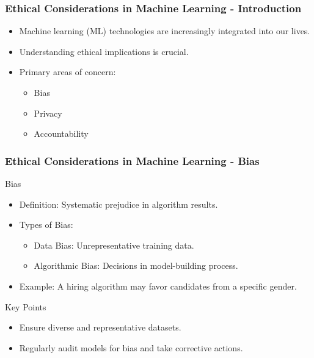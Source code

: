 \documentclass{beamer}
\begin{document}
\begin{frame}[fragile]
    \frametitle{Ethical Considerations in Machine Learning - Introduction}
    \begin{itemize}
        \item Machine learning (ML) technologies are increasingly integrated into our lives.
        \item Understanding ethical implications is crucial.
        \item Primary areas of concern:
        \begin{itemize}
            \item Bias
            \item Privacy
            \item Accountability
        \end{itemize}
    \end{itemize}
\end{frame}

\begin{frame}[fragile]
    \frametitle{Ethical Considerations in Machine Learning - Bias}
    \begin{block}{Bias}
        \begin{itemize}
            \item Definition: Systematic prejudice in algorithm results.
            \item Types of Bias:
            \begin{itemize}
                \item Data Bias: Unrepresentative training data.
                \item Algorithmic Bias: Decisions in model-building process.
            \end{itemize}
            \item Example: A hiring algorithm may favor candidates from a specific gender.
        \end{itemize}
    \end{block}
    \begin{block}{Key Points}
        \begin{itemize}
            \item Ensure diverse and representative datasets.
            \item Regularly audit models for bias and take corrective actions.
        \end{itemize}
    \end{block}
\end{frame}
\end{document}
